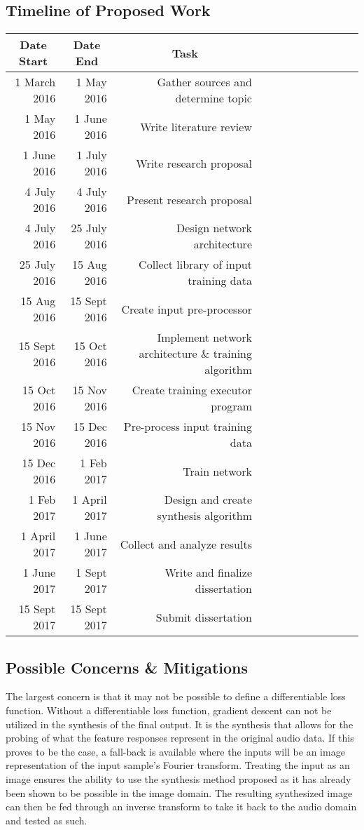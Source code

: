\documentclass[12pt]{article}
\newcommand{\ra}[1]{\renewcommand{\arraystretch}{#1}}
\begin{document}
\subsection{Timeline of Proposed Work}
\ra{1.3}
\begin{tabular}{@{}rrrrcrrrcrrr@{}}
\toprule
\multicolumn{1}{c}{Date Start} & \multicolumn{1}{c}{Date End} & \multicolumn{1}{c}{Task}
\\\midrule
1 March 2016 & 1 May 2016 & Gather sources and determine topic \\
1 May 2016 & 1 June 2016 & Write literature review\\
1 June 2016 & 1 July 2016 & Write research proposal \\
4 July 2016 & 4 July 2016 & Present research proposal \\
4 July 2016 & 25 July 2016 & Design network architecture \\
25 July 2016 & 15 Aug 2016 & Collect library of input training data \\
15 Aug 2016 & 15 Sept 2016 & Create input pre-processor \\
15 Sept 2016 & 15 Oct 2016 & Implement network architecture \& training algorithm \\
15 Oct 2016 & 15 Nov 2016 & Create training executor program \\
15 Nov 2016 & 15 Dec 2016 & Pre-process input training data \\
15 Dec 2016 & 1 Feb 2017 & Train network \\
1 Feb 2017 & 1 April 2017 & Design and create synthesis algorithm \\
1 April 2017 & 1 June 2017 & Collect and analyze results \\
1 June 2017 & 1 Sept 2017 & Write and finalize dissertation \\
15 Sept 2017 & 15 Sept 2017 & Submit dissertation\\
\bottomrule
\end{tabular}

\subsection{Possible Concerns \& Mitigations}
The largest concern is that it may not be possible to define a differentiable loss function. Without a differentiable loss function, gradient descent can not be utilized in the synthesis of the final output. It is the synthesis that allows for the probing of what the feature responses represent in the original audio data. If this proves to be the case, a fall-back is available where the inputs will be an image representation of the input sample's Fourier transform. Treating the input as an image ensures the ability to use the synthesis method proposed as it has already been shown to be possible in the image domain. The resulting synthesized image can then be fed through an inverse transform to take it back to the audio domain and tested as such.
\end{document}
